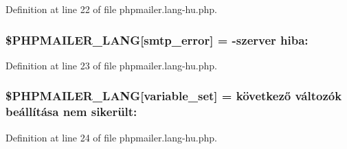 Definition at line 22 of file phpmailer.\+lang-\/hu.\+php.

\subsubsection[{\texorpdfstring{\$\+P\+H\+P\+M\+A\+I\+L\+E\+R\+\_\+\+L\+A\+NG}{$PHPMAILER_LANG}}]{\setlength{\rightskip}{0pt plus 5cm}\$P\+H\+P\+M\+A\+I\+L\+E\+R\+\_\+\+L\+A\+NG\mbox{[}\textquotesingle{}smtp\+\_\+error\textquotesingle{}\mbox{]} = -\/szerver hiba\+: \textquotesingle{}}\hypertarget{phpmailer_8lang-hu_8php_a7d9cffba1e669c845f8a4c891ee50064}{}\label{phpmailer_8lang-hu_8php_a7d9cffba1e669c845f8a4c891ee50064}


Definition at line 23 of file phpmailer.\+lang-\/hu.\+php.

\subsubsection[{\texorpdfstring{\$\+P\+H\+P\+M\+A\+I\+L\+E\+R\+\_\+\+L\+A\+NG}{$PHPMAILER_LANG}}]{\setlength{\rightskip}{0pt plus 5cm}\$P\+H\+P\+M\+A\+I\+L\+E\+R\+\_\+\+L\+A\+NG\mbox{[}\textquotesingle{}variable\+\_\+set\textquotesingle{}\mbox{]} =  következő változók beállítása nem sikerült\+: \textquotesingle{}}\hypertarget{phpmailer_8lang-hu_8php_af795debc7a739d038742691c358d9032}{}\label{phpmailer_8lang-hu_8php_af795debc7a739d038742691c358d9032}


Definition at line 24 of file phpmailer.\+lang-\/hu.\+php.

